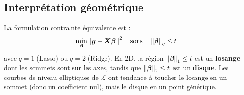 \subsection{Interpr\'etation g\'eom\'etrique}

\begin{intuition}[title=\textbf{Pourquoi $\ell_1$ produit des z\'eros et pas $\ell_2$}]
La formulation contrainte \'equivalente est :
\[
  \min_{\bm{\beta}} \left\| \bm{y} - \bm{X}\bm{\beta} \right\|^2
  \quad \text{sous} \quad \left\| \bm{\beta} \right\|_q \leq t
\]
avec $q = 1$ (Lasso) ou $q = 2$ (Ridge). En 2D, la r\'egion $\left\| \bm{\beta} \right\|_1 \leq t$
est un \textbf{losange} dont les sommets sont sur les axes, tandis que
$\left\| \bm{\beta} \right\|_2 \leq t$ est un \textbf{disque}. Les courbes de niveau
elliptiques de $\mathcal{L}$ ont tendance \`a toucher le losange en un sommet (donc
un coefficient nul), mais le disque en un point g\'en\'erique.
\end{intuition}

